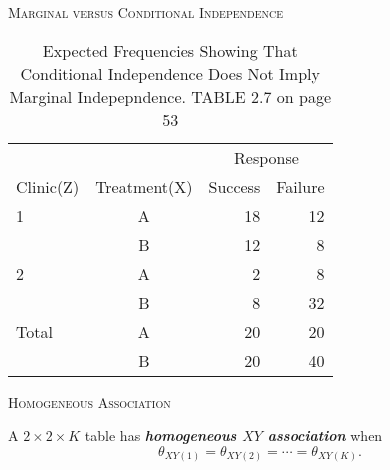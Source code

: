 \documentclass[dvipdfmx, serif,handout]{beamer}
\begin{document}
\begin{frame}{\textsc{Marginal versus Conditional Independence}}

{\scriptsize
\begin{table} %
\begin{tabular}{lcrr} \hline
&& \multicolumn{2}{c}{Response}(Y) \\ \cline{3-4}
Clinic(Z) & Treatment(X) & Success & Failure \\ \hline
1 & A & 18 & 12 \\
  & B & 12 & 8 \\
2 & A & 2 & 8 \\
  & B & 8 & 32  \\ \cline{3-4}
  \hspace{.2cm}Total & A & 20 &20 \\
                     & B& 20 & 40 \\ \hline
\end{tabular}
\caption{\scriptsize Expected Frequencies Showing That Conditional Independence Does Not Imply Marginal Indepepndence. TABLE 2.7 on page 53}
\end{table}
}

\end{frame}
\begin{frame}{\textsc{Homogeneous Association}}

\bi
\item A $2 \times 2 \times K$ table has {\bf{\em homogeneous $XY$ association}} when
$$\theta_{XY(1)} = \theta_{XY(2)} = \cdots =\theta_{XY(K)}.$$
\ei

\end{frame}
\end{document}
